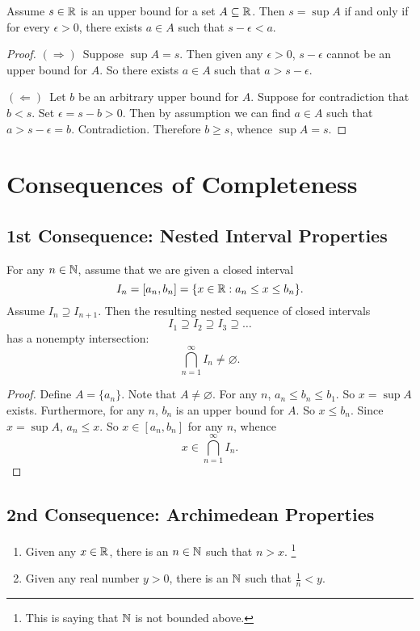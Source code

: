 \begin{lemma}
  Assume $s \in \mathbb{R}$ is an upper bound for a set
  $A \subseteq \mathbb{R}$. Then $s = \sup A$ if and only
  if for every $\epsilon > 0$, there exists
  $a \in A$ such that  $s - \epsilon < a$.
\end{lemma}

\begin{proof}
$(\Rightarrow)$\, Suppose $\sup A = s$. Then given any
$\epsilon > 0$,  $s - \epsilon$ cannot be an upper
bound for $A$. So there exists $a \in A$ such that
$a > s - \epsilon$.

$(\Leftarrow)$\, Let $b$ be an arbitrary upper bound
for $A$. Suppose for contradiction that $b < s$. Set
$\epsilon = s - b > 0$. Then by assumption we can
find $a \in A$ such that $a > s - \epsilon = b$.
Contradiction. Therefore $b \ge s$, whence $\sup A = s$.
\end{proof}

\section{Consequences of Completeness}
\subsection{1st Consequence: Nested Interval Properties}
\begin{theorem}
  For any $n \in \mathbb{N}$, assume that we are given a closed
  interval
  \[
    I_n = [a_n, b_n] = \{x \in \mathbb{R} : a_n \le x \le b_n\}
  .\]
  Assume $I_n \supseteq I_{n+1}$. Then the resulting
  nested sequence of closed intervals
  \[I_1 \supseteq I_2 \supseteq I_3 \supseteq \dots\]
  has a nonempty intersection:
  \[\bigcap_{n=1}^\infty I_n \ne \varnothing.\]
\end{theorem}

\begin{proof}
  Define $A = \{a_n\}$. Note that  $A \ne \varnothing$.
  For any $n$, $a_n \le b_n \le b_1$. So $x = \sup A$
  exists. Furthermore, for any $n$, $b_n$ is an upper
  bound for $A$. So  $x \le b_n$. Since  $x = \sup A$,
  $a_n \le x$. So $x \in [a_n, b_n]$ for any $n$,
  whence
  \[x \in \bigcap_{n = 1}^\infty I_n.\]
\end{proof}

\subsection{2nd Consequence: Archimedean Properties}
\begin{theorem}\leavevmode
  \begin{enumerate}
    \item Given any $x \in \mathbb{R}$, there is an $n \in \mathbb{N}$
      such that $n > x$.
    \footnote{This is saying that $\mathbb{N}$ is not bounded
      above.}
    \item Given any real number $y > 0$, there is an
      $\mathbb{N}$ such that  $\frac{1}{n} < y$.
  \end{enumerate}
\end{theorem}

